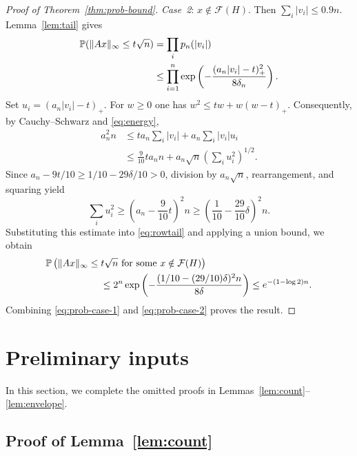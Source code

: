 \documentclass[11pt,reqno]{amsart}
\begin{document}
\begin{proof}[Proof of Theorem~\ref{thm:prob-bound}]
    \medskip
    {\em Case~2}: $x\notin\mathcal F(H)$. Then $\sum_i|v_i|\le0.9n$. Lemma~\ref{lem:tail} gives
    \begin{equation}\label{eq:rowtail}
    \begin{aligned}
        {\mathbb{P}}(\|Ax\|_\infty\le t\sqrt n)
        &=\prod_i p_n(|v_i|)\\
        &\le\prod_{i=1}^n\exp\left(-\frac{(a_n|v_i|-t)_+^2}{8\delta_n}\right).
    \end{aligned}
    \end{equation}
    Set $u_i=(a_n|v_i|-t)_+$. For $w\ge0$ one has $w^2\le tw+w(w-t)_+$. Consequently, by Cauchy--Schwarz and \eqref{eq:energy},
    \[
    \begin{aligned}
        a_n^2n
        &\le ta_n\sum_i|v_i|+a_n\sum_i|v_i|u_i\\
        &\le\frac9{10}ta_n n
             +a_n\sqrt n\left(\sum_i u_i^2\right)^{1/2}.
    \end{aligned}
    \]
    Since $a_n-9t/10\ge1/10-29\delta/10>0$, division by $a_n\sqrt n$, rearrangement, and squaring yield
    \[
        \sum_i u_i^2\ge\left(a_n-\frac9{10}t\right)^2n
        \ge\left(\frac1{10}-\frac{29}{10}\delta\right)^2n.
    \]
    Substituting this estimate into \eqref{eq:rowtail} and applying a union bound, we obtain
    \begin{equation}\label{eq:prob-case-2}
    \begin{aligned}
        &\bbP\left(\|Ax\|_{\infty}\le t\sqrt n
            \mbox{ for some }x\notin\mathcal F(H)\right)\\
        &\hspace{20mm}\le2^n\exp\left(-\frac{(1/10-(29/10)\delta)^2n}{8\delta}\right)
        \le e^{-(1-\log2)n}.
    \end{aligned}
    \end{equation}
    Combining \eqref{eq:prob-case-1} and \eqref{eq:prob-case-2} proves the result.
\end{proof}



\section{Preliminary inputs}

In this section, we complete the omitted proofs in Lemmas~\ref{lem:count}--\ref{lem:envelope}.

\subsection{Proof of Lemma~\ref{lem:count}}
\end{document}
